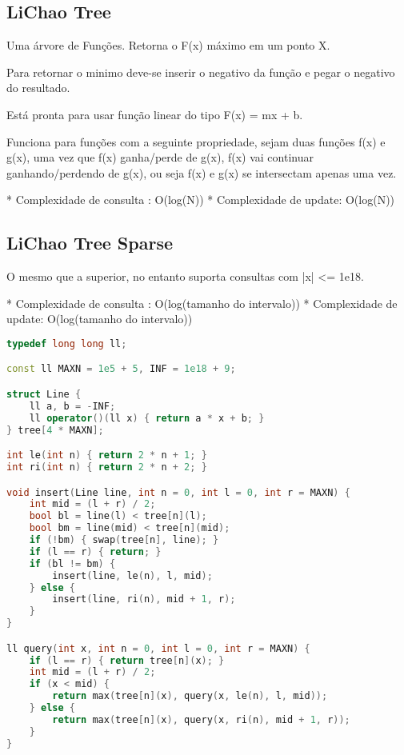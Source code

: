 \documentclass[11pt, a4paper, twoside]{article}
\begin{document}
\subsection{LiChao Tree}


Uma árvore de Funções. Retorna o F(x) máximo em um ponto X.

Para retornar o minimo deve-se inserir o negativo da função e pegar o negativo do resultado.

Está pronta para usar função linear do tipo F(x) = mx + b.

Funciona para funções com a seguinte propriedade, sejam duas funções f(x) e g(x), uma vez que f(x) ganha/perde de g(x), f(x) vai continuar ganhando/perdendo de g(x),
ou seja f(x) e g(x) se intersectam apenas uma vez.

* Complexidade de consulta : O(log(N))
* Complexidade de update: O(log(N))

\subsection{LiChao Tree Sparse}


O mesmo que a superior, no entanto suporta consultas com |x| <= 1e18.

* Complexidade de consulta : O(log(tamanho do intervalo))
* Complexidade de update: O(log(tamanho do intervalo))

\begin{lstlisting}[language=C++]
typedef long long ll;

const ll MAXN = 1e5 + 5, INF = 1e18 + 9;

struct Line {
    ll a, b = -INF;
    ll operator()(ll x) { return a * x + b; }
} tree[4 * MAXN];

int le(int n) { return 2 * n + 1; }
int ri(int n) { return 2 * n + 2; }

void insert(Line line, int n = 0, int l = 0, int r = MAXN) {
    int mid = (l + r) / 2;
    bool bl = line(l) < tree[n](l);
    bool bm = line(mid) < tree[n](mid);
    if (!bm) { swap(tree[n], line); }
    if (l == r) { return; }
    if (bl != bm) {
        insert(line, le(n), l, mid);
    } else {
        insert(line, ri(n), mid + 1, r);
    }
}

ll query(int x, int n = 0, int l = 0, int r = MAXN) {
    if (l == r) { return tree[n](x); }
    int mid = (l + r) / 2;
    if (x < mid) {
        return max(tree[n](x), query(x, le(n), l, mid));
    } else {
        return max(tree[n](x), query(x, ri(n), mid + 1, r));
    }
}
\end{lstlisting}
\end{document}
